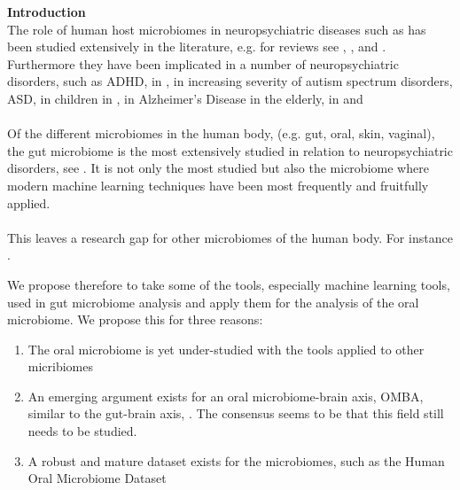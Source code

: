 \documentclass{article}
\begin{document}
\noindent
\textbf{Introduction}\\
The role of human host microbiomes in neuropsychiatric diseases such as has been studied extensively in the literature, e.g. for reviews see \cite{goswami_role_2021}, \cite{hashimoto_emerging_2023}, and \cite{bonnechere}. Furthermore they have been implicated in a number of neuropsychiatric disorders, such as ADHD, in \cite{bull-larsen_potential_2019}, in increasing severity of autism spectrum disorders, ASD, in children in \cite{TOMOVA2015179}, in Alzheimer's Disease in the elderly, in \cite{yk_microbiota-gut-brain_2018} and \cite{escobar_influence_2022}
\\~\\
Of the different microbiomes in the human body, (e.g. gut, oral, skin, vaginal), the gut microbiome is the most extensively studied in relation to neuropsychiatric disorders, see \cite{sorboni_comprehensive_2022}. It is not only the most studied but also the microbiome where modern machine learning techniques have been most frequently and fruitfully applied. 
\\~\\
This leaves a research gap for other microbiomes of the human body. For instance \cite{goswami_role_2021}. 

We propose therefore to take some of the tools, especially machine learning tools, used in gut microbiome analysis and apply them for the analysis of the oral microbiome. We propose this for three reasons:

\begin{enumerate}
	\item The oral microbiome is yet under-studied with the tools applied to other micribiomes
	\item An emerging argument exists for an oral microbiome-brain axis, OMBA, similar to the gut-brain axis, \cite{bowland_oral-microbiome-brain_2022}. The consensus seems to be that this field still needs to be studied.
	\item A robust and mature dataset exists for the microbiomes, such as the Human Oral Microbiome Dataset
\end{enumerate} 



\end{document}
